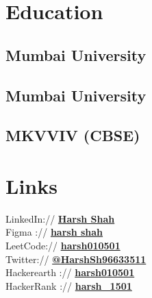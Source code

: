 \begin{minipage}[t]{0.33\textwidth} 


\section{Education} 

\subsection{Mumbai University}
\sectionsep

\subsection{Mumbai University}
\sectionsep

\subsection{MKVVIV (CBSE)}
\sectionsep


\section{Links}
LinkedIn://  \href{https://www.linkedin.com/in/harsh-shah-84492a144/}{\bf Harsh Shah} \\
Figma :// \href{https://www.figma.com/files/user/972091920433097624?fuid=972091920433097624}{\bf harsh shah} \\
LeetCode://  \href{https://leetcode.com/harsh010501/}{\bf harsh010501} \\
Twitter://  \href{https://twitter.com/HarshSh96633511}{\bf @HarshSh96633511} \\
Hackerearth :// \href{https://www.hackerearth.com/@harsh010501}{\bf harsh010501} \\
HackerRank :// \href{https://www.hackerrank.com/harsh_1501}{\bf harsh\_1501} \\


\end{minipage}
